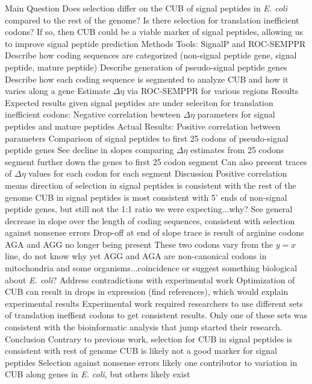 \documentclass[11pt]{labbook}
\begin{document}
\begin{outline}[enumerate]
\1 Main Question
	\2 Does selection differ on the CUB of signal peptides in \textit{E. coli} compared to the rest of the genome? Is there selection for translation inefficient codons?
	\2 If so, then CUB could be a viable marker of signal peptides, allowing us to improve signal peptide prediction
\1 Methods
	\2 Tools: SignalP and ROC-SEMPPR
	\2 Describe how coding sequences are categorized (non-signal peptide gene, signal peptide, mature peptide)
	\2 Describe generation of pseudo-signal peptide genes
	\2 Describe how each coding sequence is segmented to analyze CUB and how it varies along a gene
	\2 Estimate $\Delta\eta$ via ROC-SEMPPR for various regions
\1 Results
	\2 Expected results given signal peptides are under seleciton for translation inefficient codons: Negative correlation bewteen $\Delta\eta$ parameters for signal peptides and mature peptides
	\2 Actual Results: Positive correlation between parameters
	\2 Comparison of signal peptides to first 25 codons of pseudo-signal peptide genes
	\2 See decline in slopes comparing $\Delta\eta$ estimates from 25 codons segment further down the genes to first 25 codon segment
		\3 Can also present traces of $\Delta\eta$ values for each codon for each segment
\1 Discussion
	\2 Positive correlation means direction of selection in signal peptides is consistent with the rest of the genome
	\2 CUB in signal peptides is most consistent with 5' ends of non-signal peptide genes, but still not the 1:1 ratio we were expecting...why?
	\2 See general decrease in slope over the length of coding sequences, consistent with selection against nonsense errors
	\2 Drop-off at end of slope trace is result of arginine codons AGA and AGG no longer being present
		\3 These two codons vary from the $y = x$ line, do not know why yet
		\3 AGG and AGA are non-canonical codons in mitochondria and some organisms...coincidence or suggest something biological about \textit{E. coli}?
	\2 Address contradictions with experimental work
		\3 Optimization of CUB can result in drops in expression (find references), which would explain experimental results
		\3 Experimental work required researchers to use different sets of translation ineffient codons to get consistent results. 
			\4 Only one of these sets was consistent with the bioinformatic analysis that jump started their research.
\1 Conclusion
	\2 Contrary to previous work, selection for CUB in signal peptides is consistent with rest of genome
	\2 CUB is likely not a good marker for signal peptides
	\2 Selection against nonsense errors likely one contributor to variation in CUB along genes in \textit{E. coli}, but others likely exist
            
\end{outline}
\end{document}
